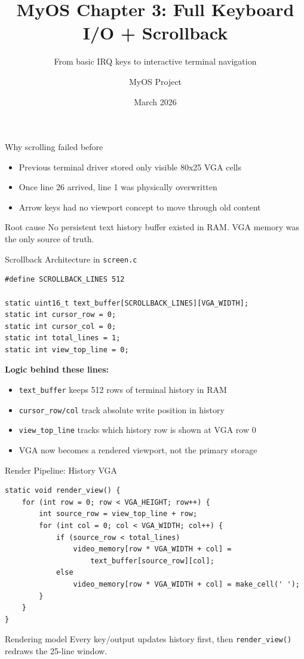 \documentclass[aspectratio=169]{beamer}
\title[MyOS Chapter 3]{\textbf{MyOS Chapter 3: Full Keyboard I/O + Scrollback}}
\subtitle{From basic IRQ keys to interactive terminal navigation}
\author{MyOS Project}
\date{March 2026}
\institute{Interrupt-driven input subsystem}
\newcommand{\concept}[2]{%
  \begin{block}{#1}\smallskip #2\smallskip\end{block}\vspace{5pt}}
\begin{document}
\begin{frame}
  \titlepage
\end{frame}

\begin{frame}{Why scrolling failed before}
  \begin{itemize}
    \item Previous terminal driver stored only visible 80x25 VGA cells
    \item Once line 26 arrived, line 1 was physically overwritten
    \item Arrow keys had no viewport concept to move through old content
  \end{itemize}
  \vspace{6pt}
  \concept{Root cause}{
    No persistent text history buffer existed in RAM. VGA memory was the only source of truth.
  }
\end{frame}

\begin{frame}[fragile]{Scrollback Architecture in \texttt{screen.c}}
  \begin{lstlisting}[style=clang]
#define SCROLLBACK_LINES 512

static uint16_t text_buffer[SCROLLBACK_LINES][VGA_WIDTH];
static int cursor_row = 0;
static int cursor_col = 0;
static int total_lines = 1;
static int view_top_line = 0;
  \end{lstlisting}
  \textbf{Logic behind these lines:}
  \begin{itemize}
    \item \texttt{text\_buffer} keeps 512 rows of terminal history in RAM
    \item \texttt{cursor\_row/col} track absolute write position in history
    \item \texttt{view\_top\_line} tracks which history row is shown at VGA row 0
    \item VGA now becomes a rendered viewport, not the primary storage
  \end{itemize}
\end{frame}

\begin{frame}[fragile]{Render Pipeline: History \textrightarrow VGA}
  \begin{lstlisting}[style=clang]
static void render_view() {
    for (int row = 0; row < VGA_HEIGHT; row++) {
        int source_row = view_top_line + row;
        for (int col = 0; col < VGA_WIDTH; col++) {
            if (source_row < total_lines)
                video_memory[row * VGA_WIDTH + col] =
                    text_buffer[source_row][col];
            else
                video_memory[row * VGA_WIDTH + col] = make_cell(' ');
        }
    }
}
  \end{lstlisting}
  \concept{Rendering model}{
    Every key/output updates history first, then \texttt{render\_view()} redraws the 25-line window.
  }
\end{frame}
\end{document}
